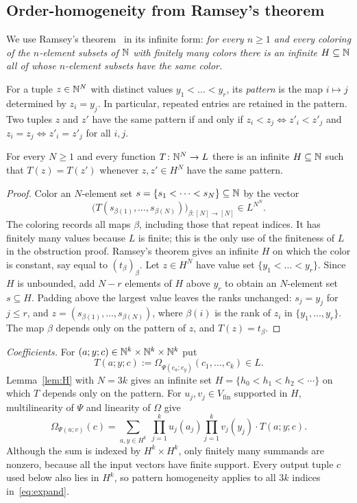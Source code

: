 \subsection{Order-homogeneity from Ramsey's theorem}
We use Ramsey's theorem~\cite{Ra} in its infinite form: \emph{for every $n\ge1$ and every coloring of the
$n$\nobreakdash-element subsets of $\mathbb N$ with finitely many colors there is an infinite $H\subseteq\mathbb N$ all of whose $n$\nobreakdash-element
subsets have the same color.}

For a tuple $z\in\mathbb N^N$ with distinct values $y_1<\dots<y_r$, its \emph{pattern} is the map
$i\mapsto j$ determined by $z_i=y_j$. In particular, repeated entries are retained in the pattern. Two tuples $z$
and $z'$ have the same pattern if and only if $z_i<z_j\Leftrightarrow z'_i<z'_j$ and $z_i=z_j\Leftrightarrow z'_i=z'_j$ for
all $i,j$.

\begin{lemma}\label{lem:H}
For every $N\ge1$ and every function $T\colon\mathbb N^N\to L$ there is an infinite $H\subseteq\mathbb N$ such that $T(z)=T(z')$
whenever $z,z'\in H^N$ have the same pattern.
\end{lemma}

\begin{proof}
Color an $N$\nobreakdash-element set $s=\{s_1<\dots<s_N\}\subseteq\mathbb N$ by the vector
\[
\bigl(T(s_{\beta(1)},\dots,s_{\beta(N)})\bigr)_{\beta\colon[N]\to[N]}\in L^{N^N}.
\]
The coloring records all maps $\beta$, including those that repeat indices. It has finitely many values because
$L$ is finite; this is the only use of the finiteness of $L$ in the obstruction proof. Ramsey's theorem gives an
infinite $H$ on which the color is constant, say equal to $(t_\beta)_\beta$. Let $z\in H^N$ have value set
$\{y_1<\dots<y_r\}$. Since $H$ is unbounded, add $N-r$ elements of $H$ above $y_r$ to obtain an
$N$\nobreakdash-element set $s\subseteq H$. Padding above the largest value leaves the ranks unchanged: $s_j=y_j$ for
$j\le r$, and
$z=(s_{\beta(1)},\dots,s_{\beta(N)})$, where $\beta(i)$ is the rank of $z_i$ in $\{y_1,\dots,y_r\}$. The map $\beta$
depends only on the pattern of $z$, and $T(z)=t_\beta$.
\end{proof}

\emph{Coefficients.} For $(a;y;c)\in\mathbb N^k\times\mathbb N^k\times\mathbb N^k$ put
\[
T(a;y;c):=\Omega_{\Psi(e_a;e_y)}(c_1,\dots,c_k)\in L .
\]
Lemma~\ref{lem:H} with $N=3k$ gives an infinite set $H=\{h_0<h_1<h_2<\cdots\}$ on which $T$ depends only on the pattern.
For $u_j,v_j\in V_{\mathrm{fin}}$ supported in $H$, multilinearity of $\Psi$ and linearity of $\Omega$ give
\begin{equation}\label{eq:expand}
\Omega_{\Psi(u;v)}(c)=\sum_{a,y\in H^k}\ \prod_{j=1}^ku_j(a_j)\prod_{j=1}^kv_j(y_j)\cdot T(a;y;c).
\end{equation}
Although the sum is indexed by $H^k\times H^k$, only finitely many summands are nonzero, because all the input
vectors have finite support. Every output tuple $c$ used below also lies in $H^k$, so pattern homogeneity applies to
all $3k$ indices in~\eqref{eq:expand}.

